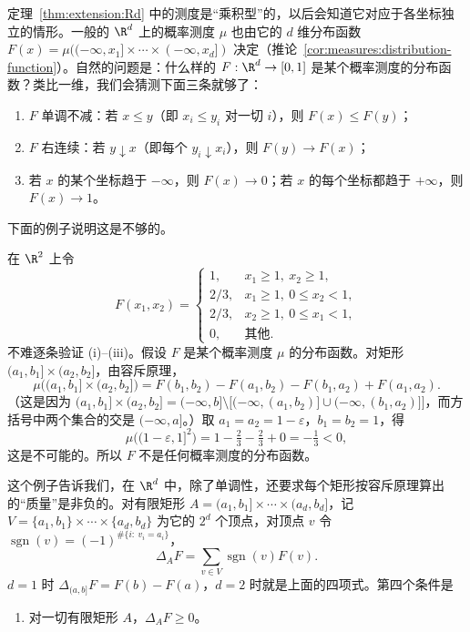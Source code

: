 
定理~\ref{thm:extension:Rd} 中的测度是“乘积型”的，以后会知道它对应于各坐标独立的情形。一般的 $\R^d$ 上的概率测度 $\mu$ 也由它的 $d$ 维分布函数 $F(x)=\mu((-\infty,x_1]\times\cdots\times(-\infty,x_d])$ 决定（推论~\ref{cor:measures:distribution-function}）。自然的问题是：什么样的 $F:\R^d\to[0,1]$ 是某个概率测度的分布函数？类比一维，我们会猜测下面三条就够了：
\begin{enumerate}
\item[(i)] $F$ 单调不减：若 $x\leqslant y$（即 $x_i\leqslant y_i$ 对一切 $i$），则 $F(x)\leqslant F(y)$；
\item[(ii)] $F$ 右连续：若 $y\downarrow x$（即每个 $y_i\downarrow x_i$），则 $F(y)\to F(x)$；
\item[(iii)] 若 $x$ 的某个坐标趋于 $-\infty$，则 $F(x)\to0$；若 $x$ 的每个坐标都趋于 $+\infty$，则 $F(x)\to1$。
\end{enumerate}
下面的例子说明这是不够的。

\begin{example}\label{ex:extension:bad-F}
在 $\R^2$ 上令
\[
F(x_1,x_2)=\begin{cases}1,&x_1\geqslant1,\ x_2\geqslant1,\\ 2/3,&x_1\geqslant1,\ 0\leqslant x_2<1,\\ 2/3,&x_2\geqslant1,\ 0\leqslant x_1<1,\\ 0,&\text{其他}.\end{cases}
\]
不难逐条验证 (i)--(iii)。假设 $F$ 是某个概率测度 $\mu$ 的分布函数。对矩形 $(a_1,b_1]\times(a_2,b_2]$，由容斥原理，
\[
\mu\bigl((a_1,b_1]\times(a_2,b_2]\bigr)=F(b_1,b_2)-F(a_1,b_2)-F(b_1,a_2)+F(a_1,a_2).
\]
（这是因为 $(a_1,b_1]\times(a_2,b_2]=(-\infty,b]\setminus\bigl[(-\infty,(a_1,b_2)]\cup(-\infty,(b_1,a_2)]\bigr]$，而方括号中两个集合的交是 $(-\infty,a]$。）取 $a_1=a_2=1-\varepsilon$，$b_1=b_2=1$，得
\[
\mu\bigl((1-\varepsilon,1]^2\bigr)=1-\tfrac23-\tfrac23+0=-\tfrac13<0,
\]
这是不可能的。所以 $F$ 不是任何概率测度的分布函数。
\end{example}

这个例子告诉我们，在 $\R^d$ 中，除了单调性，还要求每个矩形按容斥原理算出的“质量”是非负的。对有限矩形 $A=(a_1,b_1]\times\cdots\times(a_d,b_d]$，记 $V=\{a_1,b_1\}\times\cdots\times\{a_d,b_d\}$ 为它的 $2^d$ 个顶点，对顶点 $v$ 令 $\operatorname{sgn}(v)=(-1)^{\#\{i:\ v_i=a_i\}}$，
\[
\Delta_AF=\sum_{v\in V}\operatorname{sgn}(v)F(v).
\]
$d=1$ 时 $\Delta_{(a,b]}F=F(b)-F(a)$，$d=2$ 时就是上面的四项式。第四个条件是
\begin{enumerate}
\item[(iv)] 对一切有限矩形 $A$，$\Delta_AF\geqslant0$。
\end{enumerate}

